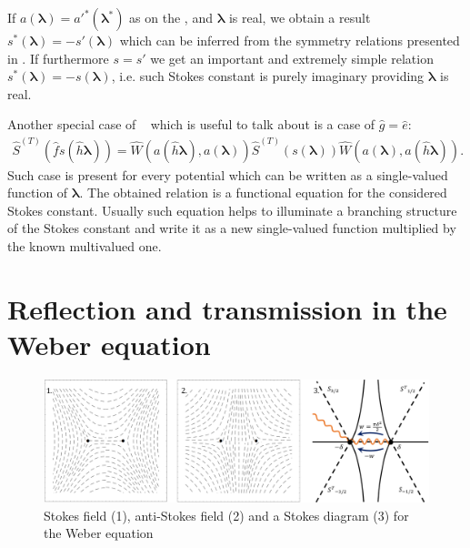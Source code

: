 \documentclass[12pt]{iopart}
\def\S{\hat{S}}
\def\W{\hat{W}}
\def\f{\hat{f}}
\def\g{\hat{g}}
\def\h{\hat{h}}
\def\lmbd{\bm{\lambda}}
\begin{document}
If $a(\lmbd)=a'^*(\lmbd^*)$ as on the , and $\lmbd$ is real, we obtain a result 
$s^*(\lmbd)=-s'(\lmbd)$ which can be inferred from the symmetry relations presented in \cite{symm}. 
If furthermore $s=s'$ we get an important and extremely simple relation $s^*(\lmbd)=-s(\lmbd)$, i.e. such Stokes constant is purely imaginary providing $\lmbd$ is real.

Another special case of ~ which is useful to talk about is a case of $\g=\hat{e}$:
\begin{eqnarray}
\S^{(T)} \left( \f s(\h\lmbd) \right) = 
\W \left( a(\h\lmbd),a(\lmbd) \right)
\S^{(T)} \left( s(\lmbd) \right)
\W \left( a(\lmbd),a(\h\lmbd) \right).
\label{eq:func}
\end{eqnarray}
Such case is present for every potential which can be written as a single-valued function of $\lmbd$.
The obtained relation is a functional equation for the considered Stokes constant. Usually such equation helps to illuminate a branching structure of the Stokes constant and write it as a new single-valued function multiplied by the known multivalued one.

\section{Reflection and transmission in the Weber equation \label{sec:weber}}

\begin{figure}
\centering
\noindent
\includegraphics[scale=.5]{stuff/wsd.png}
\caption{Stokes field (1), anti-Stokes field (2) and a Stokes diagram (3) for the Weber equation ~}
\label{fig:wsd}
\end{figure} 
\end{document}
